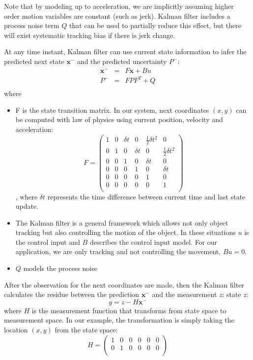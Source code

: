 Note that by modeling up to acceleration, we are implicitly assuming higher order motion variables are constant (such as jerk). Kalman filter includes a process noise term $Q$ that can be used to partially reduce this effect, but there will exist systematic tracking bias if there is jerk change.

At any time instant, Kalman filter can use current state information to infer the predicted next state $\mathbf{x}^-$ and the predicted uncertainty $P^-$:
\begin{eqnarray}
\mathbf{x}^- & = &F \mathbf{x} + Bu\\
P^- & = & FPF^T + Q\\
\end{eqnarray}
where
\begin{itemize}
\item F is the state transition matrix. In our system, next coordinates $(x,y)$ can be computed with law of physics using current position, velocity and acceleration:
\[
F  =  \left(\begin{array}{cccccc}
1 & 0 & \delta t & 0 & \frac{1}{2}\delta t^2 & 0 \\
0 & 1 & 0 & \delta t & 0 & \frac{1}{2} \delta t^2 \\
0 & 0 & 1 & 0 & \delta t & 0\\
0 & 0 & 0 & 1 & 0 & \delta t\\
0 & 0 & 0 & 0 & 1 & 0 \\
0 & 0 & 0 & 0 & 0 & 1 \\
\end{array}\right)
\], where $\delta t$ represents the time difference between current time and last state update. 
\item The Kalman filter is a general framework which allows not only object tracking but also controlling the motion of the object. In these situations $u$ is the control input and $B$ describes the control input model. For our application, we are only tracking and not controlling the movement, $Bu = 0$.
\item $Q$ models the process noise
\end{itemize}

After the observation for the next coordinates are made, then the Kalman filter calculates the residue between the prediction $\mathbf{x}^-$ and the measurement $z$:
state $z$:
\[
y = z - H\mathbf{x}^-
\]
where $H$ is the measurement function that transforms from state space to measurement space. In our example, the transformation is simply taking the location $(x,y)$ from the state space:
\[
H = \left(\begin{array}{cccccc}
1 & 0 & 0 & 0 & 0 & 0 \\
0 & 1 & 0 & 0 & 0 & 0 \\
\end{array}\right)
\]

